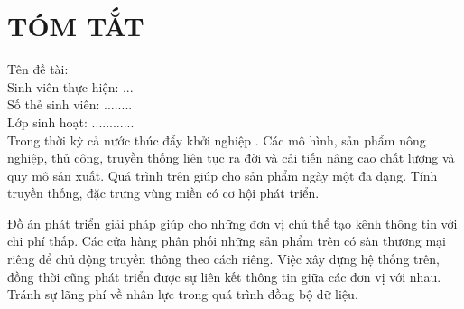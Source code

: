 \fontsize{13px}{13px}\selectfont\justifying

\clearpage
{}
\chapter*{TÓM TẮT}
\fontsize{13px}{13px}\selectfont\justifying

\raggedright
Tên đề tài: \project\\
Sinh viên thực hiện: ...\me \dotfill\\
Số thẻ sinh viên: ........ \msv \dotfill\\
Lớp sinh hoạt: ............ \myclass \dotfill\\
\vspace{14px}
\justifying
Trong thời kỳ cả nước thúc đẩy khởi nghiệp \cite{ocop}. Các mô hình, sản phẩm nông nghiệp, thủ công, truyền thống liên tục ra đời và cải tiến nâng cao chất lượng và quy mô sản xuất. Quá trình trên giúp cho sản phẩm ngày một đa dạng. Tính truyền thống, đặc trưng vùng miền có cơ hội phát triển.

Đồ án phát triển giải pháp giúp cho những đơn vị chủ thể tạo kênh thông tin với chi phí thấp. Các cửa hàng phân phối những sản phẩm trên có sàn thương mại riêng để chủ động truyền thông theo cách riêng. Việc xây dựng hệ thống trên, đồng thời cũng phát triển được sự liên kết thông tin giữa các đơn vị với nhau. Tránh sự lãng phí về nhân lực trong quá trình đồng bộ dữ liệu.

	
\pagebreak
